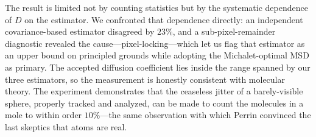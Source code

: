 \documentclass[11pt]{article}
\begin{document}
The result is limited not by counting statistics but by the systematic dependence of
$D$ on the estimator. We confronted that dependence directly: an independent
covariance-based estimator disagreed by $23\%$, and a sub-pixel-remainder diagnostic
revealed the cause---pixel-locking---which let us flag that estimator as an upper
bound on principled grounds while adopting the Michalet-optimal MSD as primary. The
accepted diffusion coefficient lies inside the range spanned by our three estimators,
so the measurement is honestly consistent with molecular theory. The experiment
demonstrates that the ceaseless jitter of a barely-visible sphere, properly tracked
and analyzed, can be made to count the molecules in a mole to within order
$10\%$---the same observation with which Perrin convinced the last skeptics that
atoms are real.
\end{document}
